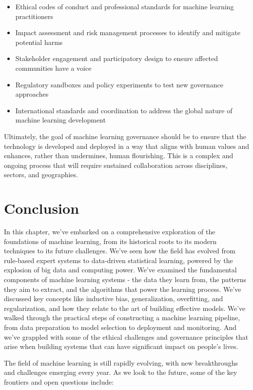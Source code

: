 \documentclass[
  9pt,
  letterpaper,
  abstract,
  titlepage]{scrbook}
\begin{document}
\begin{itemize}
\item
  Ethical codes of conduct and professional standards for machine
  learning practitioners
\item
  Impact assessment and risk management processes to identify and
  mitigate potential harms
\item
  Stakeholder engagement and participatory design to ensure affected
  communities have a voice
\item
  Regulatory sandboxes and policy experiments to test new governance
  approaches
\item
  International standards and coordination to address the global nature
  of machine learning development
\end{itemize}

Ultimately, the goal of machine learning governance should be to ensure
that the technology is developed and deployed in a way that aligns with
human values and enhances, rather than undermines, human flourishing.
This is a complex and ongoing process that will require sustained
collaboration across disciplines, sectors, and geographies.

\section{Conclusion}\label{conclusion}

In this chapter, we've embarked on a comprehensive exploration of the
foundations of machine learning, from its historical roots to its modern
techniques to its future challenges. We've seen how the field has
evolved from rule-based expert systems to data-driven statistical
learning, powered by the explosion of big data and computing power.
We've examined the fundamental components of machine learning systems -
the data they learn from, the patterns they aim to extract, and the
algorithms that power the learning process. We've discussed key concepts
like inductive bias, generalization, overfitting, and regularization,
and how they relate to the art of building effective models. We've
walked through the practical steps of constructing a machine learning
pipeline, from data preparation to model selection to deployment and
monitoring. And we've grappled with some of the ethical challenges and
governance principles that arise when building systems that can have
significant impact on people's lives.

The field of machine learning is still rapidly evolving, with new
breakthroughs and challenges emerging every year. As we look to the
future, some of the key frontiers and open questions include:
\end{document}
